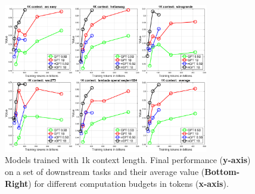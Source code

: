 \documentclass{article} %
\begin{document}
\clearpage
\begin{figure}[t]
\begin{center}
    \includegraphics[width=0.80\textwidth]{1Ktasks.eps} 
\caption{\label{fig:f2} Models trained with 1k context length. Final performance (\textbf{y-axis}) on a set of downstream tasks and their average value (\textbf{Bottom-Right}) for different computation budgets in tokens (\textbf{x-axis}).}
\label{figure_scalingTasks1k}
\end{center}
\end{figure}
\end{document}

